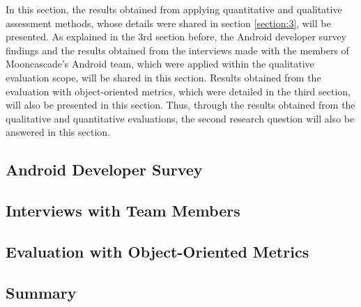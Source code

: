 In this section, the results obtained from applying quantitative and qualitative assessment methods, whose details were shared in section \ref{section:3}, will be presented. As explained in the 3rd section before, the Android developer survey findings and the results obtained from the interviews made with the members of Mooncascade's Android team, which were applied within the qualitative evaluation scope, will be shared in this section. Results obtained from the evaluation with object-oriented metrics, which were detailed in the third section, will also be presented in this section. Thus, through the results obtained from the qualitative and quantitative evaluations, the second research question will also be answered in this section.

\subsection{Android Developer Survey}


\subsection{Interviews with Team Members}


\subsection{Evaluation with Object-Oriented Metrics}


\subsection{Summary}
